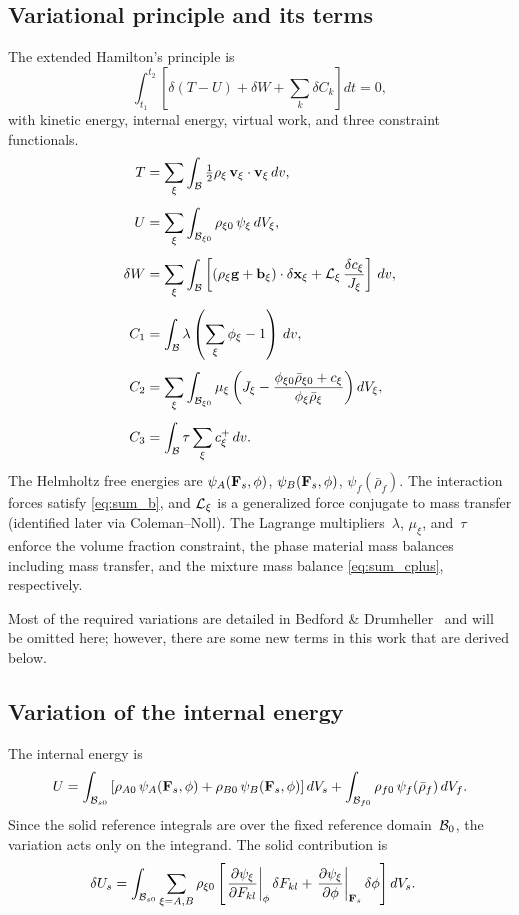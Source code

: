 \documentclass[11pt]{article}
\begin{document}
\subsection{Variational principle and its terms}

The extended Hamilton's principle is
\begin{equation*}
  \int_{t_1}^{t_2}\left[\delta(T - U) + \delta W + \sum_k \delta C_k\right] dt = 0,
\end{equation*}
with kinetic energy, internal energy, virtual work, and three constraint functionals.
\begin{align*}
  T &= \sum_\xi \int_{\mathcal{B}} \tfrac{1}{2}\rho_\xi\,\mathbf{v}_\xi\cdot\mathbf{v}_\xi \,dv,  \\[4pt]
  U &= \sum_\xi \int_{\mathcal{B}_{\xi 0}} \rho_{\xi 0}\,\psi_\xi \,dV_\xi,  \\[4pt]
  \delta W &= \sum_\xi \int_{\mathcal{B}} \left[(\rho_\xi\mathbf{g} + \mathbf{b}_\xi)\cdot\delta\mathbf{x}_\xi + \mathcal{L}_\xi\,\frac{\delta c_\xi}{J_\xi}\right] \,dv,  \\[4pt]
  C_1 &= \int_{\mathcal{B}} \lambda\left(\sum_\xi\phi_\xi - 1\right) \,dv,  \\[4pt]
  C_2 &= \sum_\xi \int_{\mathcal{B}_{\xi 0}} \mu_\xi\left(J_\xi - \frac{\phi_{\xi 0}\bar\rho_{\xi 0} + c_\xi}{\phi_\xi\bar\rho_\xi}\right) dV_\xi,  \\[4pt]
  C_3 &= \int_{\mathcal{B}} \tau\sum_\xi c^+_\xi \,dv.
\end{align*}
The Helmholtz free energies are $\psi_A(\mathbf{F}_s, \phi)$, $\psi_B(\mathbf{F}_s, \phi)$, $\psi_f(\bar\rho_f)$.  The interaction forces satisfy \eqref{eq:sum_b}, and $\mathcal{L}_\xi$ is a generalized force conjugate to mass transfer (identified later via Coleman--Noll).  The Lagrange multipliers~$\lambda$, $\mu_\xi$, and~$\tau$ enforce the volume fraction constraint, the phase material mass balances including mass transfer, and the mixture mass balance \eqref{eq:sum_cplus}, respectively.

Most of the required variations are detailed in Bedford \& Drumheller~\cite{drumheller1980thermomechanical} and will be omitted here; however, there are some new terms in this work that are derived below.

\subsection{Variation of the internal energy}

The internal energy is
\[
  U = \int_{\mathcal{B}_{s0}} \left[\rho_{A0}\,\psi_A(\mathbf{F}_s, \phi) + \rho_{B0}\,\psi_B(\mathbf{F}_s, \phi)\right] dV_s + \int_{\mathcal{B}_{f0}} \rho_{f0}\,\psi_f(\bar\rho_f)\,dV_f.
\]
Since the solid reference integrals are over the fixed reference domain~$\mathcal{B}_{0}$, the variation acts only on the integrand.  The solid contribution is
\begin{align}
  \delta U_s &= \int_{\mathcal{B}_{s0}} \sum_{\xi=A,B} \rho_{\xi 0} \left[\left.\frac{\partial \psi_\xi}{\partial F_{kl}}\right\vert_\phi \delta F_{kl} + \left.\frac{\partial \psi_\xi}{\partial \phi}\right\vert_{\mathbf{F}_s} \delta\phi \right] dV_s.
  \label{eq:deltaU_solid}
\end{align}
\end{document}
